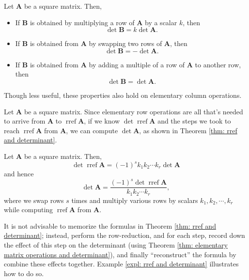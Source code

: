 \documentclass[]{book}
\DeclareMathOperator{\rref}{rref}
\newcommand{\mat}[1]{\ensuremath{\mathbf{#1}}}
\begin{document}
\begin{theorem}
    \label{thm: elementary matrix operations and determinant}
    Let $\mat{A}$ be a square matrix. Then,
    \begin{itemize}
        \item If $\mat{B}$ is obtained by multiplying a row of $\mat{A}$ by a scalar $k$, then
        \[\det\mat{B} = k\det\mat{A}.\]
        \item If $\mat{B}$ is obtained from $\mat{A}$ by swapping two rows of $\mat{A}$, then
        \[\det\mat{B} = -\det\mat{A}.\]
        \item If $\mat{B}$ is obtained from $\mat{A}$ by adding a multiple of a row of $\mat{A}$ to another row, then
        \[\det\mat{B} = \det\mat{A}.\]
    \end{itemize}
    Though less useful, these properties also hold on elementary column operations.
\end{theorem}

Let $\mat{A}$ be a square matrix. Since elementary row operations are all that's needed to arrive from $\mat{A}$ to $\rref\mat{A}$, if we know $\det\rref\mat{A}$ and the steps we took to reach $\rref\mat{A}$ from $\mat{A}$, we can compute $\det\mat{A}$, as shown in Theorem \ref{thm: rref and determinant}.

\begin{theorem}
    \label{thm: rref and determinant}
    Let $\mat{A}$ be a square matrix. Then, 
    \[\det\rref\mat{A} = (-1)^{s}k_1k_2\cdots k_r \det\mat{A}\] and hence
    \[\det\mat{A} = \frac{(-1)^{s}\det\rref\mat{A}}{k_1k_2 \cdots k_r},\] where we swap rows $s$ times and multiply various rows by scalars $k_1, k_2, \cdots, k_r$ while computing $\rref\mat{A}$ from $\mat{A}$.
\end{theorem}

It is not advisable to memorize the formulas in Theorem \ref{thm: rref and determinant}; instead, perform the row-reduction, and for each step, record down the effect of this step on the determinant (using Theorem \ref{thm: elementary matrix operations and determinant}), and finally ``reconstruct'' the formula by combine these effects together. Example \ref{expl: rref and determinant} illustrates how to do so.
\end{document}
